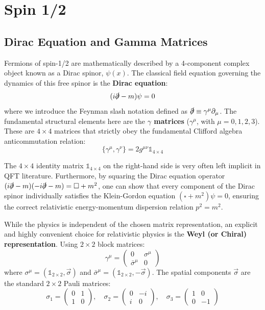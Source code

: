 \section{Spin 1/2}

\subsection{Dirac Equation and Gamma Matrices}

Fermions of spin-1/2 are mathematically described by a 4-component complex object known as a Dirac spinor, $\psi(x)$. The classical field equation governing the dynamics of this free spinor is the \textbf{Dirac equation}:
\[
    (i\slashed{\partial} - m)\psi = 0
\]
where we introduce the Feynman slash notation defined as $\slashed{\partial} \equiv \gamma^\mu \partial_\mu$. The fundamental structural elements here are the \textbf{$\gamma$ matrices} ($\gamma^\mu$, with $\mu = 0, 1, 2, 3$). These are $4 \times 4$ matrices that strictly obey the fundamental Clifford algebra anticommutation relation:
\[
    \{ \gamma^\mu, \gamma^\nu \} = 2g^{\mu\nu}\mathbb{1}_{4\times 4}
\]
\begin{remark}
    The $4 \times 4$ identity matrix $\mathbb{1}_{4\times 4}$ on the right-hand side is very often left implicit in QFT literature. Furthermore, by squaring the Dirac equation operator $(i\slashed{\partial} - m)(-i\slashed{\partial} - m) = \square + m^2$, one can show that every component of the Dirac spinor individually satisfies the Klein-Gordon equation $(\square + m^2)\psi = 0$, ensuring the correct relativistic energy-momentum dispersion relation $p^2 = m^2$.
\end{remark}

While the physics is independent of the chosen matrix representation, an explicit and highly convenient choice for relativistic physics is the \textbf{Weyl (or Chiral) representation}. Using $2 \times 2$ block matrices:
\[
    \gamma^\mu = \begin{pmatrix} 0 & \sigma^\mu \\ \bar{\sigma}^\mu & 0 \end{pmatrix}
\]
where $\sigma^\mu = (\mathbb{1}_{2\times 2}, \vec{\sigma})$ and $\bar{\sigma}^\mu = (\mathbb{1}_{2\times 2}, -\vec{\sigma})$. The spatial components $\vec{\sigma}$ are the standard $2 \times 2$ Pauli matrices:
\[
    \sigma_1 = \begin{pmatrix} 0 & 1 \\ 1 & 0 \end{pmatrix}, \quad \sigma_2 = \begin{pmatrix} 0 & -i \\ i & 0 \end{pmatrix}, \quad \sigma_3 = \begin{pmatrix} 1 & 0 \\ 0 & -1 \end{pmatrix}
\]


